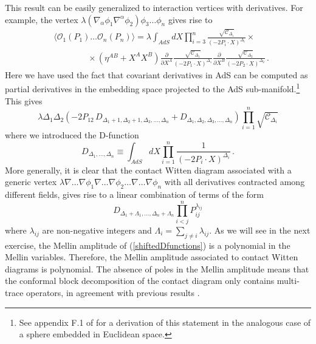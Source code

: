 \documentclass{ws-rv9x6}
\newcommand\be{\begin{equation}}
\newcommand\ee{\end{equation}}
\newcommand\D{\Delta}
\newcommand\Op{\mathcal{O}}
\begin{document}
This result can be easily generalized to interaction vertices with derivatives. For example, the vertex $\lambda (\nabla_\alpha \phi_1 \nabla^\alpha \phi_2) \phi_3 \dots \phi_n$ gives rise to 
\begin{align}
&\langle \Op_1(P_1) \dots \Op_n(P_n) \rangle =
\lambda \int_{AdS} dX 
\prod_{i=3}^n \frac{ \sqrt{\mathcal{C}_{\D_i}}}{
(-2P_i \cdot X)^{\D_i}} \times\label{AdScontactder} \\
&\qquad\qquad \times
(\eta^{AB}+X^AX^B)
\frac{\partial}{\partial X^A} \frac{ \sqrt{\mathcal{C}_{\D_1}}}{
(-2P_1 \cdot X)^{\D_1}}
\frac{\partial}{\partial X^B}
\frac{ \sqrt{\mathcal{C}_{\D_2}}}{
(-2P_2 \cdot X)^{\D_2}}\,.
\nonumber
\end{align}
Here we have used the fact that covariant derivatives in AdS can be computed as partial derivatives in the embedding space projected to the AdS sub-manifold.\footnote{See appendix F.1 of \cite{Costa:2016hju} for a derivation of this statement in the analogous case of a sphere embedded in Euclidean space.}
This gives
\be
\lambda \D_1 \D_2 \left( -2P_{12}\, D_{\Delta_1+1, \Delta_2+1, \Delta_3, \dots,\D_n} +
  D_{\Delta_1, \Delta_2, \Delta_3, \dots, \D_n}\right)
  \prod_{i=1}^n \sqrt{\mathcal{C}_{\D_i}}
\ee
where we introduced the D-function \cite{hep-th/9903196}
\be
D_{\Delta_1,  \dots, \D_n} \equiv  \int_{AdS} dX 
\prod_{i=1}^n \frac{1}{
(-2P_i \cdot X)^{\D_i}} \,.
\ee
More generally, it is clear that the contact Witten diagram associated with a generic vertex 
$\lambda  \nabla  \dots \nabla  \phi_1  \nabla  \dots \nabla \phi_2    \dots  \nabla  \dots \nabla\phi_n$ with all derivatives contracted among different fields, gives rise to a linear combination of terms of the form
\be
D_{\Delta_1+\Lambda_1,  \dots, \D_n+\Lambda_n} \prod_{i<j}^n P_{ij}^{\lambda_{ij}}
\label{shiftedDfunctions}
\ee
where $\lambda_{ij}$ are non-negative integers and $\Lambda_i=\sum_{j\neq i} \lambda_{ij}$. 
As we will see in the next exercise, the Mellin amplitude of (\ref{shiftedDfunctions}) is a polynomial in the Mellin variables. Therefore, the Mellin amplitude associated to contact Witten diagrams is polynomial. The absence of poles in the Mellin amplitude means that the conformal block decomposition of the contact diagram only contains multi-trace operators, in agreement with previous results \cite{Liu:1998th, D'Hoker:1998mz}.
\end{document}
